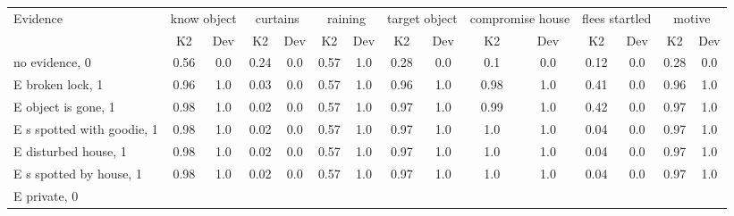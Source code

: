 \begin{table}\begin{tabular}{l|cc|cc|cc|cc|cc|cc|cc}\toprule\multirow{2}{*}{Evidence} & \multicolumn{2}{c}{know object}& \multicolumn{2}{c}{curtains}& \multicolumn{2}{c}{raining}& \multicolumn{2}{c}{target object}& \multicolumn{2}{c}{compromise house}& \multicolumn{2}{c}{flees startled}& \multicolumn{2}{c}{motive}\\& {K2} & {Dev}& {K2} & {Dev}& {K2} & {Dev}& {K2} & {Dev}& {K2} & {Dev}& {K2} & {Dev}& {K2} & {Dev}\\\midrule
no evidence, 0 & \cellcolor{Bittersweet}0.56&\cellcolor{Bittersweet}0.0&\cellcolor{Bittersweet}0.24&\cellcolor{Bittersweet}0.0&\cellcolor{Bittersweet}0.57&\cellcolor{Bittersweet}1.0&\cellcolor{Bittersweet}0.28&\cellcolor{Bittersweet}0.0&\cellcolor{Bittersweet}0.1&\cellcolor{Bittersweet}0.0&\cellcolor{Bittersweet}0.12&\cellcolor{Bittersweet}0.0&\cellcolor{Bittersweet}0.28&\cellcolor{Bittersweet}0.0\\E broken lock, 1 & \cellcolor{Bittersweet}0.96&\cellcolor{Bittersweet}1.0&\cellcolor{Bittersweet}0.03&\cellcolor{Bittersweet}0.0&\cellcolor{Bittersweet}0.57&\cellcolor{Bittersweet}1.0&\cellcolor{Bittersweet}0.96&\cellcolor{Bittersweet}1.0&\cellcolor{Bittersweet}0.98&\cellcolor{Bittersweet}1.0&0.41&0.0&\cellcolor{Bittersweet}0.96&\cellcolor{Bittersweet}1.0\\E object is gone, 1 & \cellcolor{Bittersweet}0.98&\cellcolor{Bittersweet}1.0&\cellcolor{Bittersweet}0.02&\cellcolor{Bittersweet}0.0&\cellcolor{Bittersweet}0.57&\cellcolor{Bittersweet}1.0&\cellcolor{Bittersweet}0.97&\cellcolor{Bittersweet}1.0&\cellcolor{Bittersweet}0.99&\cellcolor{Bittersweet}1.0&0.42&0.0&\cellcolor{Bittersweet}0.97&\cellcolor{Bittersweet}1.0\\E s spotted with goodie, 1 & \cellcolor{Bittersweet}0.98&\cellcolor{Bittersweet}1.0&\cellcolor{Bittersweet}0.02&\cellcolor{Bittersweet}0.0&\cellcolor{Bittersweet}0.57&\cellcolor{Bittersweet}1.0&\cellcolor{Bittersweet}0.97&\cellcolor{Bittersweet}1.0&\cellcolor{Bittersweet}1.0&\cellcolor{Bittersweet}1.0&\cellcolor{Bittersweet}0.04&\cellcolor{Bittersweet}0.0&\cellcolor{Bittersweet}0.97&\cellcolor{Bittersweet}1.0\\E disturbed house, 1 & \cellcolor{Bittersweet}0.98&\cellcolor{Bittersweet}1.0&\cellcolor{Bittersweet}0.02&\cellcolor{Bittersweet}0.0&\cellcolor{Bittersweet}0.57&\cellcolor{Bittersweet}1.0&\cellcolor{Bittersweet}0.97&\cellcolor{Bittersweet}1.0&\cellcolor{Bittersweet}1.0&\cellcolor{Bittersweet}1.0&\cellcolor{Bittersweet}0.04&\cellcolor{Bittersweet}0.0&\cellcolor{Bittersweet}0.97&\cellcolor{Bittersweet}1.0\\E s spotted by house, 1 & \cellcolor{Bittersweet}0.98&\cellcolor{Bittersweet}1.0&\cellcolor{Bittersweet}0.02&\cellcolor{Bittersweet}0.0&\cellcolor{Bittersweet}0.57&\cellcolor{Bittersweet}1.0&\cellcolor{Bittersweet}0.97&\cellcolor{Bittersweet}1.0&\cellcolor{Bittersweet}1.0&\cellcolor{Bittersweet}1.0&\cellcolor{Bittersweet}0.04&\cellcolor{Bittersweet}0.0&\cellcolor{Bittersweet}0.97&\cellcolor{Bittersweet}1.0\\E private, 0 & 
\end{tabular}
\end{table}
